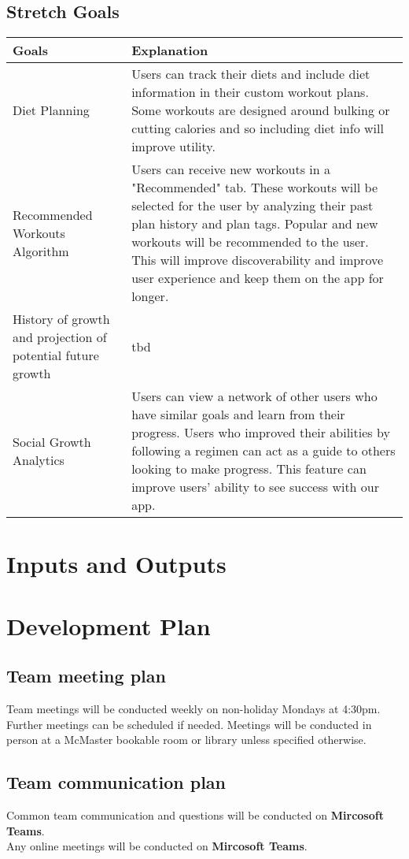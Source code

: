 \documentclass{article}
\begin{document}
\subsection{Stretch Goals}

\begin{tabular}{ |p{5cm}|p{8cm}| }
	\hline
	Goals & Explanation \\
	\hline
	Diet Planning & Users can track their diets and include diet information in their custom workout plans. Some workouts are
	designed around bulking or cutting calories and so including diet info will improve utility. \\
	\hline
	Recommended Workouts Algorithm & Users can receive new workouts in a "Recommended" tab. These workouts will be selected for the user by analyzing
	their past plan history and plan tags. Popular and new workouts will be recommended to the user. This will improve discoverability and improve
	 user experience and keep them on the app for longer.  \\
	\hline
	History of growth and projection of potential future growth & tbd \\
	\hline
	Social Growth Analytics & Users can view a network of other users who have similar goals and learn from their progress.
	Users who improved their abilities by following a regimen can act as a guide to others looking to make progress. This feature can improve
	users' ability to see success with our app. \\
	\hline
\end{tabular}



\section{Inputs and Outputs}

\section {Development Plan}

\subsection{Team meeting plan}
Team meetings will be conducted weekly on non-holiday Mondays at 4:30pm.
Further meetings can be scheduled if needed.
Meetings will be conducted in person at a McMaster bookable room or library unless specified otherwise.

\subsection{Team communication plan}
Common team communication and questions will be conducted on \textbf{Mircosoft Teams}.\\
Any online meetings will be conducted on \textbf{Mircosoft Teams}. \\
\end{document}
